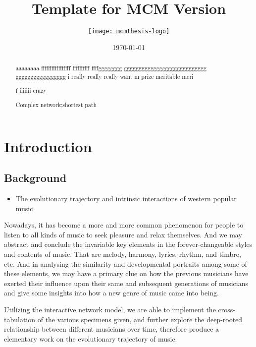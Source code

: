 \documentclass{mcmthesis}
\title{ Template for MCM Version \MCMversion}
\author{\small \href{http://www.latexstudio.net/}
  {\texttt{[image: mcmthesis-logo]}}}
\date{\today}
\begin{document}
\begin{abstract}
 aaaaaaaa fffffffffffffffff ffffffffff ffffgggggggg gggggggggggggggggggggggggggg ggggggggggggggggg
i really really really want m prize meritable meri\par f
iiiiiii crazy
\begin{keywords}
Complex network;shortest path
\end{keywords}
\end{abstract}
\maketitle
\tableofcontents
\section{Introduction}
\subsection{Background}
\begin{itemize}
\item The evolutionary trajectory and intrinsic interactions of western popular music
\end {itemize}\quad
Nowadays, it has become a more and more common phenomenon for people to listen to all kinds of music to seek pleasure and relax themselves. And we may abstract and conclude the invariable key elements in the forever-changeable styles and contents of music. That are melody, harmony, lyrics, rhythm, and timbre, etc. And in analysing the similarity and developmental portraits among some of these elements, we may have a primary clue on how the previous musicians have exerted their influence upon their same and subsequent generations of musicians and give some insights into how a new genre of music came into being.\par
Utilizing the interactive network model, we are able to implement the cross-tabulation of the various specimens given, and further explore the deep-rooted relationship between different musicians over time, therefore produce a elementary work on the evolutionary trajectory of music.
\end{document}
